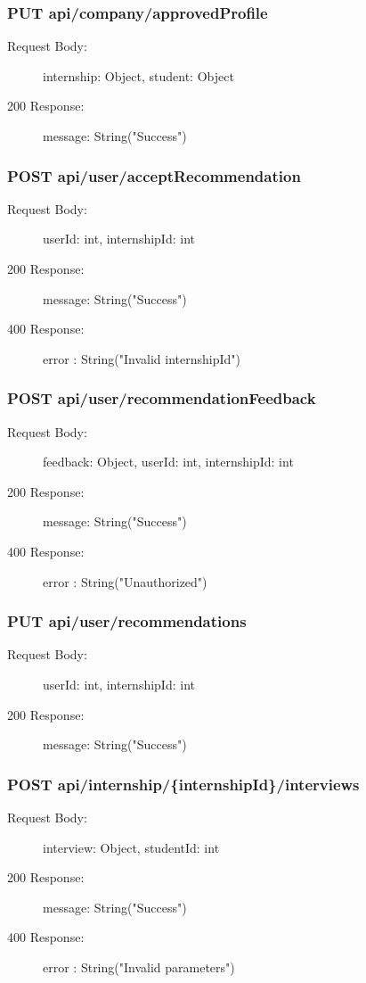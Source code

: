 \documentclass[a4paper,12pt]{article}
\begin{document}
\subsubsection*{PUT api/company/approvedProfile}
\begin{description}
    \item[Request Body:] internship: Object, student: Object
    \item[200 Response:] message: String("Success")
\end{description}

\subsubsection*{POST api/user/acceptRecommendation}
\begin{description}
    \item[Request Body:] userId: int, internshipId: int
    \item[200 Response:] message: String("Success")
    \item[400 Response:] error : String("Invalid internshipId")
\end{description}

\subsubsection*{POST api/user/recommendationFeedback}
\begin{description}
    \item[Request Body:] feedback: Object, userId: int, internshipId: int
    \item[200 Response:] message: String("Success") 
    \item[400 Response:] error : String("Unauthorized")
\end{description}

\subsubsection*{PUT api/user/recommendations}
\begin{description}
    \item[Request Body:]  userId: int, internshipId: int
    \item[200 Response:] message: String("Success") 
\end{description}

\subsubsection*{POST api/internship/\{internshipId\}/interviews}
\begin{description}
    \item[Request Body:] interview: Object, studentId: int
    \item[200 Response:] message: String("Success") 
    \item[400 Response:] error : String("Invalid parameters")
\end{description}
\end{document}
